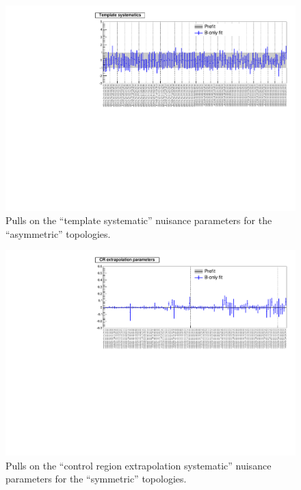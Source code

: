 \newpage
\begin{landscape}
\begin{figure}[h!]
\caption{Pulls on the ``template systematic'' nuisance parameters for the ``asymmetric'' topologies.\label{fig:nuisPull_template_asym}}
    \includegraphics[width=\linewidth]{figures/postFitResults/template_asym_ALL_nuisances.pdf}
\end{figure}
\end{landscape}


\newpage
\begin{landscape}
\begin{figure}[h!]
\caption{Pulls on the ``control region extrapolation systematic'' nuisance parameters for the ``symmetric'' topologies.\label{fig:nuisPull_extrap_sym}}
    \includegraphics[width=\linewidth]{figures/postFitResults/extrap_sym_ALL_nuisances.pdf}
\end{figure}
\end{landscape}



